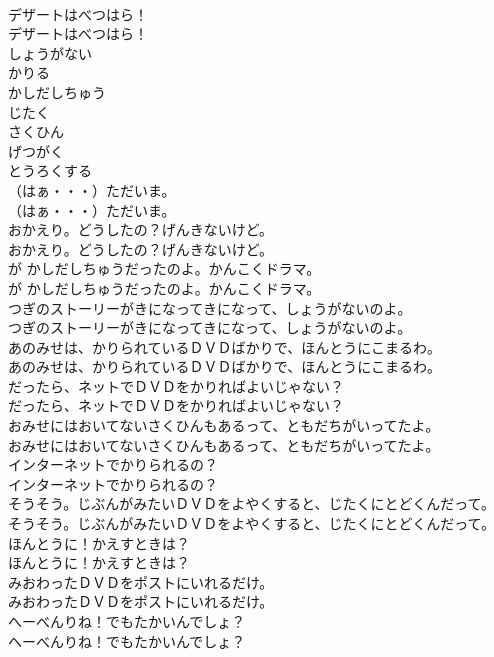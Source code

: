 \documentclass[8pt]{extreport}
\begin{document}
\begin{CJK}{UTF8}{min}
\\	デザートはべつはら！	
\\	デザートはべつはら！ 
\\	しょうがない
\\	かりる
\\	かしだしちゅう
\\	じたく
\\	さくひん
\\	げつがく
\\	とうろくする
\\	（はぁ・・・）ただいま。	
\\	（はぁ・・・）ただいま。 
\\	おかえり。どうしたの？げんきないけど。	
\\	おかえり。どうしたの？げんきないけど。 
\\	が かしだしちゅうだったのよ。かんこくドラマ。	
\\	が かしだしちゅうだったのよ。かんこくドラマ。 
\\	つぎのストーリーがきになってきになって、しょうがないのよ。	
\\	つぎのストーリーがきになってきになって、しょうがないのよ。 
\\	あのみせは、かりられているＤＶＤばかりで、ほんとうにこまるわ。	
\\	あのみせは、かりられているＤＶＤばかりで、ほんとうにこまるわ。 
\\	だったら、ネットでＤＶＤをかりればよいじゃない？	
\\	だったら、ネットでＤＶＤをかりればよいじゃない？ 
\\	おみせにはおいてないさくひんもあるって、ともだちがいってたよ。	
\\	おみせにはおいてないさくひんもあるって、ともだちがいってたよ。 
\\	インターネットでかりられるの？	
\\	インターネットでかりられるの？ 
\\	そうそう。じぶんがみたいＤＶＤをよやくすると、じたくにとどくんだって。	
\\	そうそう。じぶんがみたいＤＶＤをよやくすると、じたくにとどくんだって。 
\\	ほんとうに！かえすときは？	
\\	ほんとうに！かえすときは？ 
\\	みおわったＤＶＤをポストにいれるだけ。	
\\	みおわったＤＶＤをポストにいれるだけ。 
\\	へーべんりね！でもたかいんでしょ？	
\\	へーべんりね！でもたかいんでしょ？ 

\end{CJK}
\end{document}
